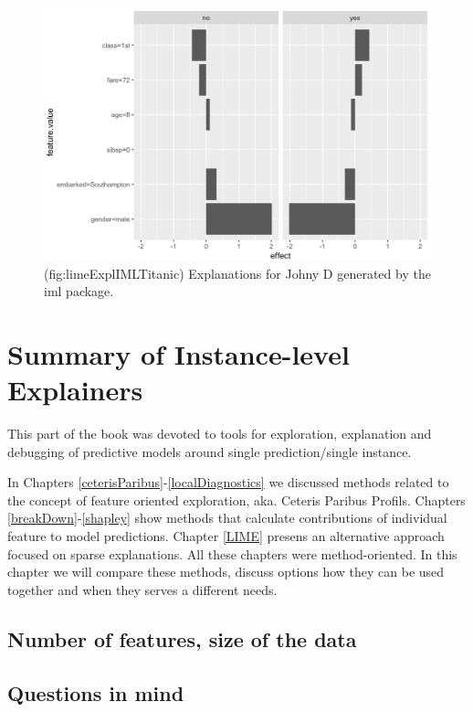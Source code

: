 \documentclass[12pt,]{krantz}
\theoremstyle{definition}
\theoremstyle{definition}
\theoremstyle{definition}
\theoremstyle{remark}
\begin{document}
\begin{figure}

{\centering \includegraphics[width=0.6\linewidth]{figure/lime_expl_iml_titanic} 

}

\caption{(fig:limeExplIMLTitanic) Explanations for Johny D generated by the iml package. }\label{fig:limeExplIMLTitanic}
\end{figure}

\hypertarget{summaryInstanceLevel}{%
\section{Summary of Instance-level
Explainers}\label{summaryInstanceLevel}}

This part of the book was devoted to tools for exploration, explanation
and debugging of predictive models around single prediction/single
instance.

In Chapters \ref{ceterisParibus}-\ref{localDiagnostics} we discussed
methods related to the concept of feature oriented exploration, aka.
Ceteris Paribus Profils. Chapters \ref{breakDown}-\ref{shapley} show
methods that calculate contributions of individual feature to model
predictions. Chapter \ref{LIME} presens an alternative approach focused
on sparse explanations. All these chapters were method-oriented. In this
chapter we will compare these methods, discuss options how they can be
used together and when they serves a different needs.

\hypertarget{number-of-features-size-of-the-data}{%
\subsection{Number of features, size of the
data}\label{number-of-features-size-of-the-data}}

\hypertarget{questions-in-mind}{%
\subsection{Questions in mind}\label{questions-in-mind}}
\end{document}
